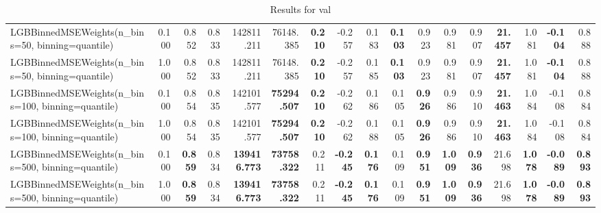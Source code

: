 \documentclass[11pt]{article}
\theoremstyle{plain}
\theoremstyle{definition}
\newcommand{\1}{\mathbf{1}}
\begin{document}
\begin{table}[htbp]
{\begin{tabular}{lrrrrrrrrrrrrrrrr}
LGBBinnedMSEWeights(n_bins=50, binning=quantile) & 0.100 & 0.852 & 0.833 & 142811.211 & 76148.385 & \textbf{0.210} & -0.257 & 0.183 & \textbf{0.103} & 0.923 & 0.981 & 0.907 & \textbf{21.457} & 1.081 & \textbf{-0.104} & 0.888 \\
LGBBinnedMSEWeights(n_bins=50, binning=quantile) & 1.000 & 0.852 & 0.833 & 142811.211 & 76148.385 & \textbf{0.210} & -0.257 & 0.185 & \textbf{0.103} & 0.923 & 0.981 & 0.907 & \textbf{21.457} & 1.081 & \textbf{-0.104} & 0.888 \\
LGBBinnedMSEWeights(n_bins=100, binning=quantile) & 0.100 & 0.854 & 0.835 & 142101.577 & \textbf{75294.507} & \textbf{0.210} & -0.262 & 0.186 & 0.105 & \textbf{0.926} & 0.986 & 0.910 & \textbf{21.463} & 1.084 & -0.108 & 0.884 \\
LGBBinnedMSEWeights(n_bins=100, binning=quantile) & 1.000 & 0.854 & 0.835 & 142101.577 & \textbf{75294.507} & \textbf{0.210} & -0.262 & 0.188 & 0.105 & \textbf{0.926} & 0.986 & 0.910 & \textbf{21.463} & 1.084 & -0.108 & 0.884 \\
LGBBinnedMSEWeights(n_bins=500, binning=quantile) & 0.100 & \textbf{0.859} & 0.834 & \textbf{139416.773} & \textbf{73758.322} & 0.211 & \textbf{-0.245} & \textbf{0.176} & 0.109 & \textbf{0.951} & \textbf{1.009} & \textbf{0.936} & 21.698 & \textbf{1.078} & \textbf{-0.089} & \textbf{0.893} \\
LGBBinnedMSEWeights(n_bins=500, binning=quantile) & 1.000 & \textbf{0.859} & 0.834 & \textbf{139416.773} & \textbf{73758.322} & 0.211 & \textbf{-0.245} & \textbf{0.176} & 0.109 & \textbf{0.951} & \textbf{1.009} & \textbf{0.936} & 21.698 & \textbf{1.078} & \textbf{-0.089} & \textbf{0.893} \\
\bottomrule
\end{tabular}
     }
    \caption{Results for val}
    \label{tab:results_val}
\end{table}
\end{document}
